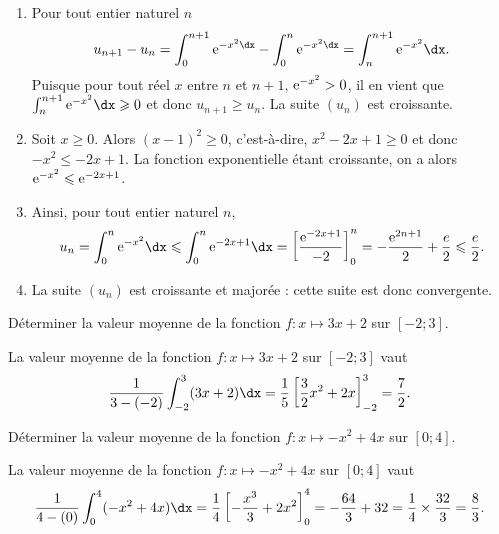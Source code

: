 \documentclass[11pt,fleqn, openany]{book} %
\begin{document}
\begin{solution}\hspace{0pt}
\begin{enumerate}
\item  Pour tout entier naturel \(n\)
\[ u_{n+1}-u_n = \displaystyle \int _{0}^{n+1}\e^{-x^2\dx}-\displaystyle \int _{0}^n\e^{-x^2\dx}=\displaystyle \int _{n}^{n+1}\e^{-x^2}\dx.\]
Puisque pour tout réel \(x\) entre \(n\) et \(n+1\), \(\mathrm{e}^{-x^2}>0\), il en vient que \(\int _{n}^{n+1}\e^{-x^2}\dx \geqslant 0\) et donc \(u_{n+1} \geqslant u_n\). La suite \((u_n)\) est croissante.
\item  Soit \(x\geqslant 0\). Alors \((x-1)^2\geqslant 0\), c'est-à-dire, \(x^2-2x+1 \geqslant 0\) et donc \(-x^2 \leqslant -2x+1\). La fonction exponentielle étant croissante, on a alors \(\mathrm{e}^{-x^2}\leqslant \mathrm{e}^{-2x+1}\).
\item  Ainsi, pour tout entier naturel \(n\),
\[u_n=\int _{0}^n\e^{-x^2}\dx \leqslant \int _{0}^n\e^{-2x+1}\dx = \left[\dfrac{\e^{-2x+1}}{-2}\right]_0^n=-\dfrac{\e^{2n+1}}{2}+\dfrac{e}{2}\leqslant \dfrac{e}{2}.\]

\item  La suite \((u_n)\) est croissante et majorée : cette suite est donc convergente.
\end{enumerate}\end{solution}



\begin{exercise}[topic=int02]Déterminer la valeur moyenne de la fonction $f:x\mapsto 3x+2$ sur $[-2;3]$.\end{exercise}

\begin{solution}
La valeur moyenne de la fonction \(f:x\mapsto 3x+2\) sur \([-2;3]\) vaut
\[ \dfrac{1}{3-(-2)}\int_{-2}^3(3x+2)\dx = \dfrac{1}{5}\left[\dfrac{3}{2}x^2+2x\right]_{-2}^3=\dfrac{7}{2}.\]\end{solution}



\begin{exercise}[topic=int02]Déterminer la valeur moyenne de la fonction $f:x\mapsto -x^2+4x$ sur $[0;4]$.\end{exercise}

\begin{solution}
La valeur moyenne de la fonction \(f:x\mapsto -x^2+4x\) sur \([0;4]\) vaut
\[ \dfrac{1}{4-(0)}\int_{0}^4(-x^2+4x)\dx = \dfrac{1}{4}\left[-\dfrac{x^3}{3}+2x^2\right]_{0}^4=-\dfrac{64}{3}+32 = \dfrac{1}{4}\times \dfrac{32}{3} = \dfrac{8}{3}.\]
\end{solution}
\end{document}
